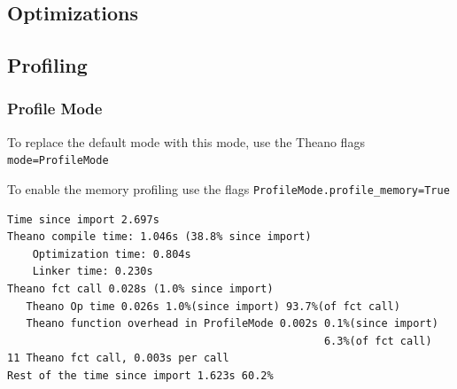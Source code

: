 \documentclass[a4paper,9pt]{beamer}
\begin{document}
\subsection{Optimizations}


\subsection{Profiling}
\begin{frame}[fragile]
\frametitle{Profile Mode}
To replace the default mode with this mode, use the Theano flags \texttt{mode=ProfileMode}

To enable the memory profiling use the flags \texttt{ProfileMode.profile\_memory=True} 
\begin{Verbatim}
Time since import 2.697s
Theano compile time: 1.046s (38.8% since import)
    Optimization time: 0.804s
    Linker time: 0.230s
Theano fct call 0.028s (1.0% since import)
   Theano Op time 0.026s 1.0%(since import) 93.7%(of fct call)
   Theano function overhead in ProfileMode 0.002s 0.1%(since import) 
                                                  6.3%(of fct call)
11 Theano fct call, 0.003s per call
Rest of the time since import 1.623s 60.2%
\end{Verbatim}
\end{frame}
\end{document}
